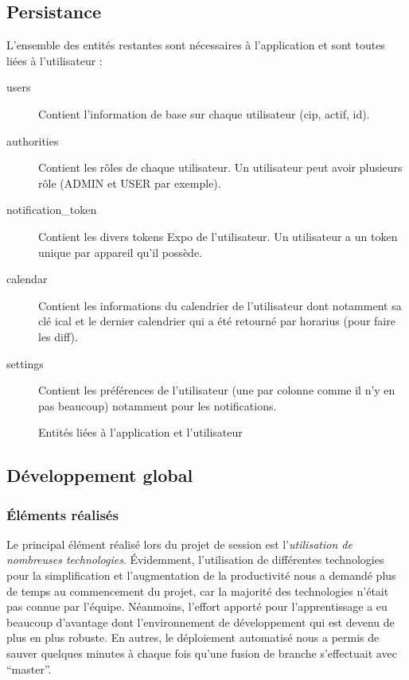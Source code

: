     \subsection{Persistance}
    L'ensemble des entités restantes sont nécessaires à l'application et sont toutes liées à l'utilisateur :
    \begin{description}
        \item[users] Contient l'information de base sur chaque utilisateur (cip, actif, id).
        \item[authorities] Contient les rôles de chaque utilisateur. Un utilisateur peut avoir plusieurs rôle (ADMIN et USER par exemple).
        \item[notification\_token] Contient les divers tokens Expo de l'utilisateur. Un utilisateur a un token unique par appareil qu'il possède.
        \item[calendar] Contient les informations du calendrier de l'utilisateur dont notamment sa clé ical et le dernier calendrier qui a été retourné par horarius (pour faire les diff).
        \item[settings] Contient les préférences de l'utilisateur (une par colonne comme il n'y en pas beaucoup) notamment pour les notifications.
    \end{description}

    \begin{figure}[hp] \centering
        
        \caption{Entités liées à l'application et l'utilisateur}
        \label{fig.persistance}
    \end{figure}
    
    \subsection{Développement global}
        \subsubsection{Éléments réalisés}
        Le principal élément réalisé lors du projet de session est l'\emph{utilisation de nombreuses technologies}. Évidemment, l'utilisation de différentes technologies pour la simplification et l'augmentation de la productivité nous a demandé plus de temps au commencement du projet, car la majorité des technologies n'était pas connue par l'équipe. Néanmoins, l'effort apporté pour l'apprentissage a eu beaucoup d'avantage dont l'environnement de développement qui est devenu de plus en plus robuste. En autres, le déploiement automatisé nous a permis de sauver quelques minutes à chaque fois qu'une fusion de branche s'effectuait avec “master”.
    
